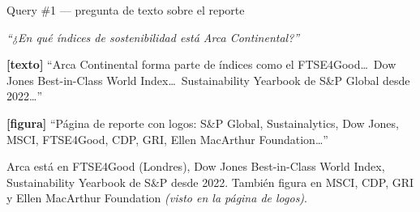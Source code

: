 \documentclass[aspectratio=169, 11pt]{beamer}
\begin{document}
\begin{frame}[shrink]{Query \#1 --- pregunta de texto sobre el reporte}
  \vspace{2pt}
  \begin{tcolorbox}[colback=arcaGray, colframe=codeBlue, leftrule=3pt,
    boxrule=0pt, sharp corners, left=8pt, right=8pt, top=4pt, bottom=4pt,
    title={\scriptsize\color{white}\bfseries Pregunta},
    coltitle=white, colbacktitle=codeBlue, fonttitle=\scriptsize]
    {\footnotesize\color{textDark}
    \itshape ``¿En qué índices de sostenibilidad está Arca Continental?''}
  \end{tcolorbox}
  \vspace{4pt}
  \begin{tcolorbox}[colback=arcaGray, colframe=codeOrange, leftrule=3pt,
    boxrule=0pt, sharp corners, left=8pt, right=8pt, top=4pt, bottom=4pt,
    title={\scriptsize\color{white}\bfseries Top-3 (mezcla texto $+$ caption)},
    coltitle=white, colbacktitle=codeOrange, fonttitle=\scriptsize]
    {\scriptsize\color{textDark}
    \textbf{[texto]} ``Arca Continental forma parte de índices como el FTSE4Good\ldots\
    Dow Jones Best-in-Class World Index\ldots\ Sustainability Yearbook de S\&P
    Global desde 2022\ldots''\par
    \textbf{[figura]} ``Página de reporte con logos: S\&P Global, Sustainalytics,
    Dow Jones, MSCI, FTSE4Good, CDP, GRI, Ellen MacArthur Foundation\ldots''}
  \end{tcolorbox}
  \vspace{4pt}
  \begin{tcolorbox}[colback=arcaGray, colframe=codeGreen, leftrule=3pt,
    boxrule=0pt, sharp corners, left=8pt, right=8pt, top=4pt, bottom=4pt,
    title={\scriptsize\color{white}\bfseries Respuesta del LLM},
    coltitle=white, colbacktitle=codeGreen, fonttitle=\scriptsize]
    {\scriptsize\color{textDark}
    Arca está en FTSE4Good (Londres), Dow Jones Best-in-Class World Index,
    Sustainability Yearbook de S\&P desde 2022. También figura en MSCI, CDP, GRI y
    Ellen MacArthur Foundation \emph{(visto en la página de logos)}.}
  \end{tcolorbox}
\end{frame}
\end{document}

